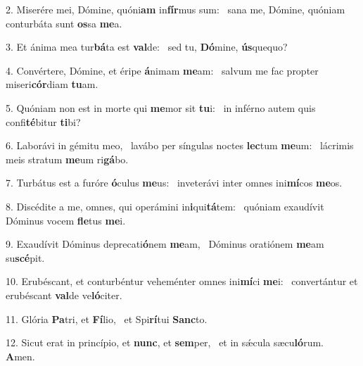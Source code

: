 2. Miserére mei, Dómine, quóni\textbf{am} in\textbf{fír}mus sum: \ast\  sana me, Dómine, quóniam conturbáta sunt \textbf{os}sa \textbf{me}a.\

3. Et ánima mea tur\textbf{bá}ta est \textbf{val}de: \ast\  sed tu, \textbf{Dó}mine, \textbf{ús}quequo?\

4. Convértere, Dómine, et éripe \textbf{á}nimam \textbf{me}am: \ast\  salvum me fac propter miseri\textbf{cór}diam \textbf{tu}am.\

5. Quóniam non est in morte qui \textbf{me}mor sit \textbf{tu}i: \ast\  in inférno autem quis confi\textbf{té}bitur \textbf{ti}bi?\

6. Laborávi in gémitu meo, \dag\  lavábo per síngulas noctes \textbf{lec}tum \textbf{me}um: \ast\  lácrimis meis stratum \textbf{me}um ri\textbf{gá}bo.\

7. Turbátus est a furóre \textbf{ó}culus \textbf{me}us: \ast\  inveterávi inter omnes ini\textbf{mí}cos \textbf{me}os.\

8. Discédite a me, omnes, qui operámini in\textbf{i}qui\textbf{tá}tem: \ast\  quóniam exaudívit Dóminus vocem \textbf{fle}tus \textbf{me}i.\

9. Exaudívit Dóminus deprecati\textbf{ó}nem \textbf{me}am, \ast\  Dóminus oratiónem \textbf{me}am su\textbf{scé}pit.\

10. Erubéscant, et conturbéntur veheménter omnes ini\textbf{mí}ci \textbf{me}i: \ast\  convertántur et erubéscant \textbf{val}de ve\textbf{ló}citer.\

11. Glória \textbf{Pa}tri, et \textbf{Fí}lio, \ast\  et Spi\textbf{rí}tui \textbf{Sanc}to.\

12. Sicut erat in princípio, et \textbf{nunc}, et \textbf{sem}per, \ast\  et in sǽcula sæcu\textbf{ló}rum. \textbf{A}men.\

